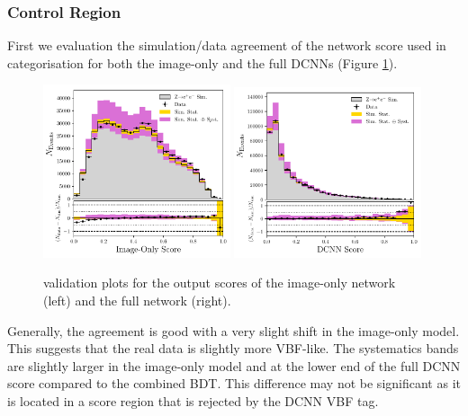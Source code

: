 \subsubsection{\Zee Control Region}
First we evaluation the simulation/data agreement of the network score used in categorisation for both the image-only and the full DCNNs (Figure \ref{fig:event_categorisation:int_score_zee}). 
\begin{figure}[h!]
    \begin{center}
        \includegraphics[width=0.49\textwidth]{figures/event_selection/img_score_zee_LPS.pdf}
        \includegraphics[width=0.49\textwidth]{figures/event_selection/int_score_zee_LPS.pdf}
    \end{center}
    \caption{\Zee validation plots for the output scores of the image-only network (left) and the full network (right).}
    \label{fig:event_categorisation:int_score_zee}
\end{figure}

Generally, the agreement is good with a very slight shift in the image-only model. This suggests that the real data is slightly more VBF-like. 
The systematics bands are slightly larger in the image-only model and at the lower end of the full DCNN score compared to the combined BDT. This difference may not be significant as it is located in a score region that is rejected by the DCNN VBF tag.  


